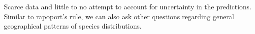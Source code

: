 \documentclass[11pt, a4paper]{article}
\begin{document}
Scarce data and little to no attempt to account for uncertainty in the predictions. Similar to rapoport's rule, we can also ask other questions regarding general geographical patterns of species distributions. 
\end{document}
